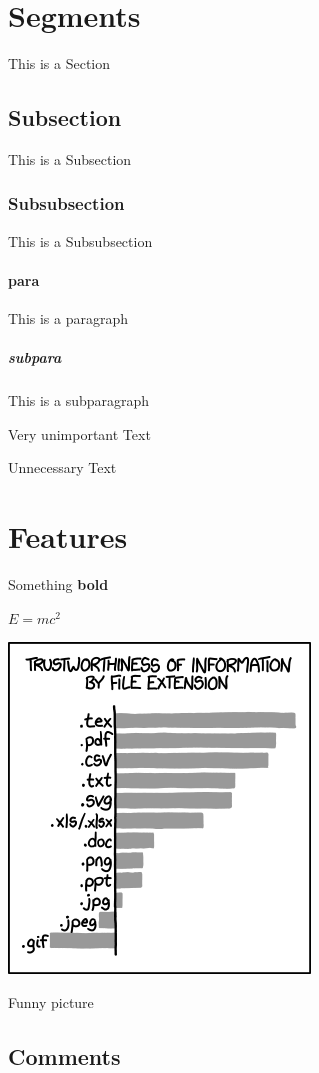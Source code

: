 \section{Segments}
This is a Section

\subsection{Subsection}
This is a Subsection

\subsubsection{Subsubsection}
This is a Subsubsection

\paragraph{para}
This is a paragraph

\subparagraph{subpara}
This is a subparagraph

Very unimportant Text

Unnecessary Text

\section{Features}
Something \textbf{bold}

$E = mc^2$

\includegraphics{image.png}
\caption{Funny picture}
\subsection{Comments}
